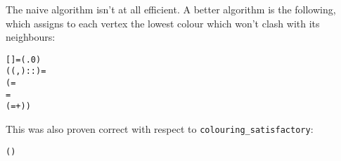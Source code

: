 \documentclass{beamer}
\begin{document}
\begin{frame}[containsverbatim]
The naive algorithm isn't at all efficient. A better algorithm is the following, which assigns to each vertex the lowest colour which won't clash with its neighbours:

\begin{alltt}\small
	 = (\HOLTokenLambda{}. 0)
 ((,)::) =
(  =   
   =   
   ( =+ ) )
\end{alltt}

This was also proven correct with respect to \texttt{colouring\_satisfactory}:

\begin{alltt}\small
	\HOLTokenTurnstile{}   \HOLTokenConj{}   \HOLTokenConj{}
     \HOLTokenImp{}
    ( ) 
\end{alltt}
\end{frame}
\end{document}
